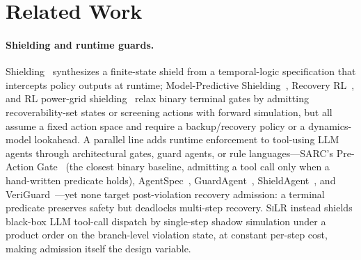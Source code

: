 \documentclass[letterpaper]{article} %
\theoremstyle{plain}
\newcommand{\silr}{\textsc{SiLR}}
\begin{document}
\section{Related Work}
\label{sec:related}

\paragraph{Shielding and runtime guards.}
Shielding~\citep{alshiekh2018safe} synthesizes a finite-state shield from a temporal-logic specification that intercepts policy outputs at runtime; Model-Predictive Shielding~\citep{bastani2019mps}, Recovery RL~\citep{thananjeyan2021recovery}, and RL power-grid shielding~\citep{hrlshield2026} relax binary terminal gates by admitting recoverability-set states or screening actions with forward simulation, but all assume a fixed action space and require a backup/recovery policy or a dynamics-model lookahead. A parallel line adds runtime enforcement to tool-using LLM agents through architectural gates, guard agents, or rule languages---SARC's Pre-Action Gate~\citep{sarc2026} (the closest binary baseline, admitting a tool call only when a hand-written predicate holds), AgentSpec~\citep{agentspec2026}, GuardAgent~\citep{guardagent2025}, ShieldAgent~\citep{shieldagent2025}, and VeriGuard~\citep{veriguard2025}---yet none target post-violation recovery admission: a terminal predicate preserves safety but deadlocks multi-step recovery. \silr{} instead shields black-box LLM tool-call dispatch by single-step shadow simulation under a product order on the branch-level violation state, at constant per-step cost, making admission itself the design variable.
\end{document}
